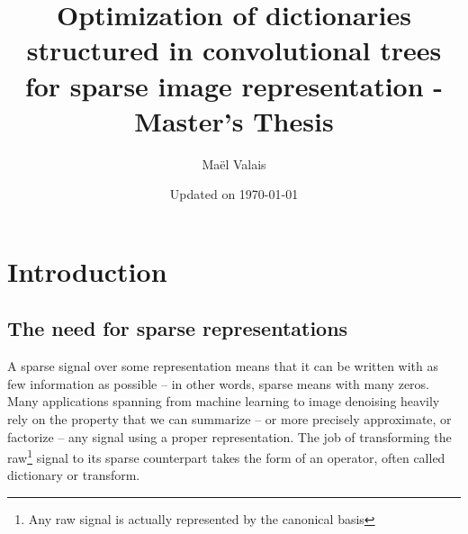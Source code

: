 


\author{Maël Valais}
\date{Updated on \today}
\title{Optimization of dictionaries structured in convolutional trees for sparse image representation - Master's Thesis}

\tableofcontents

\chapter{Introduction}

\section{The need for sparse representations}
A sparse signal over some representation means that it can be written with as few information as possible – in other words, sparse means with many zeros. Many applications spanning from machine learning to image denoising heavily rely on the property that we can summarize – or more precisely approximate, or factorize – any signal using a proper representation. The job of transforming the raw\footnote{Any raw signal is actually represented by the canonical basis} signal to its sparse counterpart takes the form of an operator, often called dictionary or transform.

